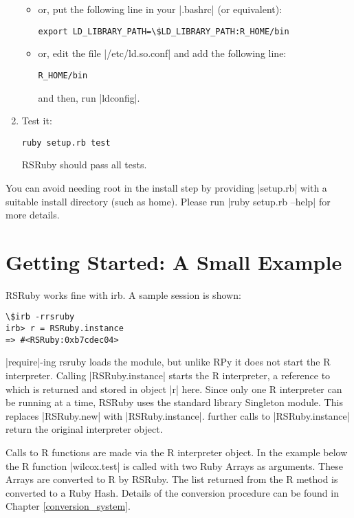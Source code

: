 \documentclass[a4paper,12pt]{book}
\begin{document}
\begin{enumerate}
\begin{itemize}
\item or, put the following line in your |.bashrc| (or equivalent):

\begin{Verbatim}
export LD_LIBRARY_PATH=\$LD_LIBRARY_PATH:R_HOME/bin
\end{Verbatim}

\item or, edit the file |/etc/ld.so.conf| and add the following line:

\begin{Verbatim}
R_HOME/bin
\end{Verbatim}

  and then, run |ldconfig|.
\end{itemize}

\item Test it:

\begin{Verbatim}
ruby setup.rb test
\end{Verbatim}

RSRuby should pass all tests.

\end{enumerate}

You can avoid needing root in the install step by providing |setup.rb| with a suitable install directory (such as home). Please run |ruby setup.rb --help| for more details.

\section{Getting Started: A Small Example}

RSRuby works fine with irb. A sample session is shown:

\begin{Verbatim}
\$irb -rrsruby
irb> r = RSRuby.instance
=> #<RSRuby:0xb7cdec04>
\end{Verbatim}

|require|-ing rsruby loads the module, but unlike RPy it does not start the R interpreter. Calling |RSRuby.instance| starts the R interpreter, a reference to which is returned and stored in object |r| here. Since only one R interpreter can be running at a time, RSRuby uses the standard library Singleton module. This replaces |RSRuby.new| with |RSRuby.instance|. further calls to |RSRuby.instance| return the original interpreter object.

Calls to R functions are made via the R interpreter object. In the example below the R function |wilcox.test| is called with two Ruby Arrays as arguments. These Arrays are converted to R by RSRuby. The list returned from the R method is converted to a Ruby Hash. Details of the conversion procedure can be found in Chapter \ref{conversion_system}.
\end{document}
